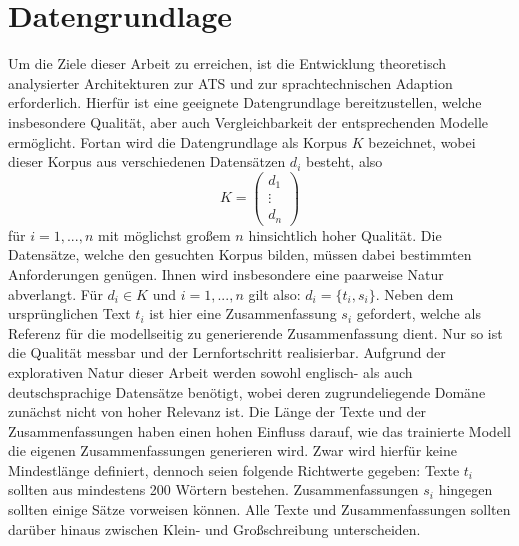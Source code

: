 \chapter{Datengrundlage}
\thispagestyle{fancy}
\label{chap:Datengrundlage}

\noindent
Um die Ziele dieser Arbeit zu erreichen, ist die Entwicklung theoretisch analysierter Architekturen zur \ac{ATS} und zur sprachtechnischen Adaption erforderlich. Hierfür ist eine geeignete Datengrundlage bereitzustellen, welche insbesondere Qualität, aber auch Vergleichbarkeit der entsprechenden Modelle ermöglicht. Fortan wird die Datengrundlage als Korpus $K$ bezeichnet, wobei dieser Korpus aus verschiedenen Datensätzen $d_i$ besteht, also $$K=\begin{pmatrix} d_1 \\ \vdots \\ d_n \end{pmatrix}$$ für $i=1,...,n$ mit möglichst großem $n$ hinsichtlich hoher Qualität. Die Datensätze, welche den gesuchten Korpus bilden, müssen dabei bestimmten Anforderungen genügen. Ihnen wird insbesondere eine paarweise Natur abverlangt. Für $d_i \in K$ und $i=1,...,n$ gilt also: $d_i=\{t_i,s_i\}$. Neben dem ursprünglichen Text $t_i$ ist hier eine Zusammenfassung $s_i$ gefordert, welche als Referenz für die modellseitig zu generierende Zusammenfassung dient. Nur so ist die Qualität messbar und der Lernfortschritt realisierbar. Aufgrund der explorativen Natur dieser Arbeit werden sowohl englisch- als auch deutschsprachige Datensätze benötigt, wobei deren zugrundeliegende Domäne zunächst nicht von hoher Relevanz ist. Die Länge der Texte und der Zusammenfassungen haben einen hohen Einfluss darauf, wie das trainierte Modell die eigenen Zusammenfassungen generieren wird. Zwar wird hierfür keine Mindestlänge definiert, dennoch seien folgende Richtwerte gegeben: Texte $t_i$ sollten aus mindestens 200 Wörtern bestehen. Zusammenfassungen $s_i$ hingegen sollten einige Sätze vorweisen können. Alle Texte und Zusammenfassungen sollten darüber hinaus zwischen Klein- und Großschreibung unterscheiden.\\

